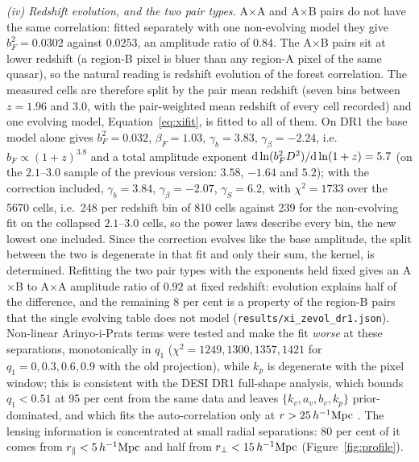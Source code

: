 \documentclass[11pt,a4paper]{article}
\newcommand{\Mpch}{\,h^{-1}{\rm Mpc}}
\begin{document}
\emph{(iv) Redshift evolution, and the two pair types.} A$\times$A and A$\times$B pairs do not have the same correlation: fitted separately with one non-evolving model they give $b_F^2=0.0302$ against $0.0253$, an amplitude ratio of $0.84$. The A$\times$B pairs sit at lower redshift (a region-B pixel is bluer than any region-A pixel of the same quasar), so the natural reading is redshift evolution of the forest correlation. The measured cells are therefore split by the pair mean redshift (seven bins between $z=1.96$ and $3.0$, with the pair-weighted mean redshift of every cell recorded) and one evolving model, Equation~\eqref{eq:xifit}, is fitted to all of them.
On DR1 the base model alone gives $b_F^2=0.032$, $\beta_F=1.03$, $\gamma_b=3.83$, $\gamma_\beta=-2.24$, i.e.\ $b_F\propto(1+z)^{3.8}$ and a total amplitude exponent ${\rm d}\ln(b_F^2D^2)/{\rm d}\ln(1+z)=5.7$ (on the $2.1$--$3.0$ sample of the previous version: $3.58$, $-1.64$ and $5.2$); with the correction included, $\gamma_b=3.84$, $\gamma_\beta=-2.07$, $\gamma_S=6.2$, with $\chi^2=1733$ over the 5670 cells, i.e.\ 248 per redshift bin of 810 cells against 239 for the non-evolving fit on the collapsed $2.1$--$3.0$ cells, so the power laws describe every bin, the new lowest one included. Since the correction evolves like the base amplitude, the split between the two is degenerate in that fit and only their sum, the kernel, is determined. Refitting the two pair types with the exponents held fixed gives an A$\times$B to A$\times$A amplitude ratio of $0.92$ at fixed redshift: evolution explains half of the difference, and the remaining 8 per cent is a property of the region-B pairs that the single evolving table does not model (\texttt{results/xi\_zevol\_dr1.json}). Non-linear Arinyo-i-Prats terms were tested and make the fit \emph{worse} at these separations, monotonically in $q_1$ ($\chi^2=1249,1300,1357,1421$ for $q_1=0,0.3,0.6,0.9$ with the old projection), while $k_p$ is degenerate with the pixel window; this is consistent with the DESI DR1 full-shape analysis, which bounds $q_1<0.51$ at 95 per cent from the same data and leaves $\{k_v,a_v,b_v,k_p\}$ prior-dominated, and which fits the auto-correlation only at $r>25\Mpch$ \citep{2509.15308}. The lensing information is concentrated at small radial separations: 80 per cent of it comes from $r_\parallel<5\Mpch$ and half from $r_\perp<15\Mpch$ (Figure~\ref{fig:profile}).
\end{document}
